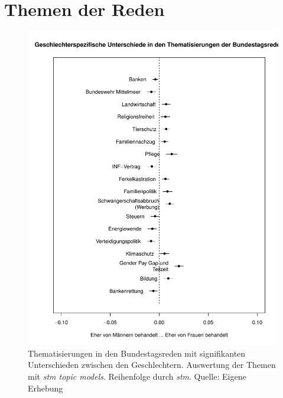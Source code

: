 \documentclass[12pt, 
    twoside=false, 
    bibliography=totoc, 
    numbers=endperiod, 
    headings=normal, 
    toc=chapterentrydotfill
    ]{scrbook}
\begin{document}
\section{Themen der Reden}





\begin{figure}
    \centering
    \includegraphics[scale=0.6]{images/stm_differences_top.pdf}
    \caption[Thematisierungen in den Bundestagsreden mit signifikanten Unterschieden zwischen den Geschlechtern]{Thematisierungen in den Bundestagsreden mit signifikanten Unterschieden zwischen den Geschlechtern. Auswertung der Themen mit \emph{stm topic models}. Reihenfolge durch \emph{stm}. Quelle: Eigene Erhebung}
    \label{fig:differences_stm_top}
\end{figure}

\end{document}
